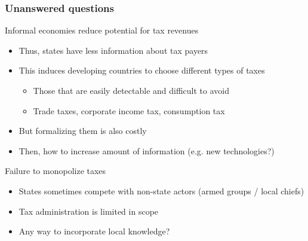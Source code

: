 \documentclass[aspectratio=169]{beamer}
\begin{document}
 
\begin{frame}
\frametitle{Unanswered questions} 
Informal economies reduce potential for tax revenues
\begin{itemize}\setlength\itemsep{3pt}
\item Thus, states have less information about tax payers
  \item This induces developing countries to choose different types of taxes
\begin{itemize}\setlength\itemsep{3pt}
\item Those that are easily detectable and difficult to avoid
\item Trade taxes, corporate income tax, consumption tax 
\end{itemize}
\item But formalizing them is also costly
\item Then, how to increase amount of information (e.g. new technologies?)
\end{itemize}\medskip
Failure to monopolize taxes
\begin{itemize}\setlength\itemsep{3pt}
\item States sometimes compete with non-state actors (armed groups / local chiefs)
  \item Tax administration is limited in scope
\item Any way to incorporate local knowledge?
\end{itemize}
\end{frame}
\end{document}
